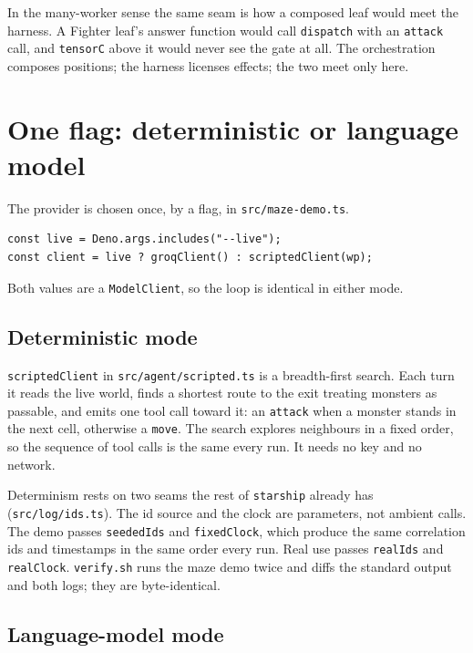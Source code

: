 \documentclass[11pt]{article}
\newcommand{\code}[1]{\texttt{#1}}
\begin{document}
In the many-worker sense the same seam is how a composed leaf would meet the
harness. A Fighter leaf's answer function would call \code{dispatch} with an
\code{attack} call, and \code{tensorC} above it would never see the gate at all.
The orchestration composes positions; the harness licenses effects; the two meet
only here.

\section{One flag: deterministic or language model}

The provider is chosen once, by a flag, in \code{src/maze-demo.ts}.

\begin{lstlisting}[language=TS]
const live = Deno.args.includes("--live");
const client = live ? groqClient() : scriptedClient(wp);
\end{lstlisting}

Both values are a \code{ModelClient}, so the loop is identical in either mode.

\subsection{Deterministic mode}

\code{scriptedClient} in \code{src/agent/scripted.ts} is a breadth-first search.
Each turn it reads the live world, finds a shortest route to the exit treating
monsters as passable, and emits one tool call toward it: an \code{attack} when a
monster stands in the next cell, otherwise a \code{move}. The search explores
neighbours in a fixed order, so the sequence of tool calls is the same every run.
It needs no key and no network.

Determinism rests on two seams the rest of \code{starship} already has
(\code{src/log/ids.ts}). The id source and the clock are parameters, not ambient
calls. The demo passes \code{seededIds} and \code{fixedClock}, which produce the
same correlation ids and timestamps in the same order every run. Real use passes
\code{realIds} and \code{realClock}. \code{verify.sh} runs the maze demo twice and
diffs the standard output and both logs; they are byte-identical.

\subsection{Language-model mode}
\end{document}
